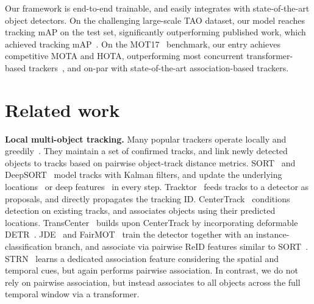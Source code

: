 \documentclass[10pt,twocolumn,letterpaper]{article}
\renewcommand{\paragraph}[1]{\noindent\textbf{#1}}
\begin{document}
Our framework is end-to-end trainable, and easily integrates with state-of-the-art object detectors.
On the challenging large-scale TAO dataset, our model reaches  tracking mAP on the test set, significantly outperforming published work, which achieved  tracking mAP~\cite{qdtrack}.
On the MOT17~\cite{MOT16} benchmark, our entry achieves competitive  MOTA and  HOTA, outperforming most concurrent transformer-based trackers~\cite{meinhardt2021trackformer,xu2021transcenter,zeng2021motr}, and on-par with state-of-the-art association-based trackers.

\section{Related work}

\paragraph{Local multi-object tracking.}
Many popular trackers operate locally and greedily~\cite{Bewley2016_sort,Wojke2018deep,bergmann2019tracking,zhou2020tracking,xu2021transcenter,wang2019towards,zhang2020fair,Tokmakov_2021_ICCV}.
They maintain a set of confirmed tracks, and link newly detected objects to tracks based on pairwise object-track distance metrics.
SORT~\cite{Bewley2016_sort} and DeepSORT~\cite{Wojke2018deep} model tracks with Kalman filters, and update the underlying locations~\cite{Bewley2016_sort} or deep features~\cite{Wojke2018deep} in every step.
Tracktor~\cite{bergmann2019tracking} feeds tracks to a detector as proposals, and directly propagates the tracking ID.
CenterTrack~\cite{zhou2020tracking} conditions detection on existing tracks, and associates objects using their predicted locations.
TransCenter~\cite{xu2021transcenter} builds upon CenterTrack by incorporating deformable DETR~\cite{zhu2020deformable}.
JDE~\cite{wang2019towards} and FairMOT~\cite{zhang2020fair} train the detector together with an instance-classification branch, and associate via pairwise ReID features similar to SORT~\cite{Bewley2016_sort}.
STRN~\cite{xu2019spatial} learns a dedicated association feature considering the spatial and temporal cues, but again performs pairwise association.
In contrast, we do not rely on pairwise association, but instead 
associates to all objects across the full temporal window via a transformer.
\end{document}
